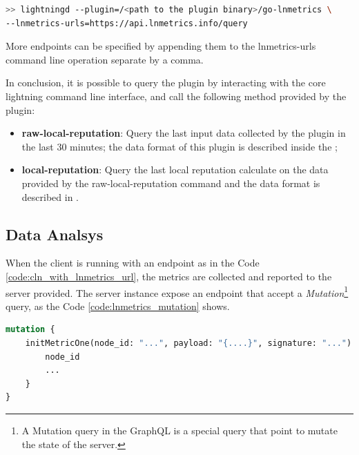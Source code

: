 \begin{lstlisting}[language=bash, basicstyle=\small,
                  caption={Command to run core lightning with the lnmetrics plugin an publish the data.}, 
                  label={code:cln_with_lnmetrics_url}]
>> lightningd --plugin=/<path to the plugin binary>/go-lnmetrics \ 
--lnmetrics-urls=https://api.lnmetrics.info/query
\end{lstlisting}

More endpoints can be specified by appending them to the lnmetrics-urls command line operation separate by a comma.

In conclusion, it is possible to query the plugin by interacting with the core lightning command line interface,
and call the following method provided by the plugin:

\begin{itemize}
    \item {\bf raw-local-reputation}: Query the last input data collected by the plugin in the last 30 minutes; 
        the data format of this plugin is described inside the \cite{lnmetrics_localreputation};
    \item {\bf local-reputation}: Query the last local reputation calculate on the data provided by the 
        raw-local-reputation command and the data format is described in \cite{lnmetrics_localreputation}.
\end{itemize}

\subsection{Data Analsys}

When the client is running with an endpoint as in the Code \ref{code:cln_with_lnmetrics_url},
the metrics are collected and reported to the server provided. The server instance expose an
endpoint that accept a \emph{Mutation}\footnote{A Mutation query in the GraphQL is a special query that point to mutate the state of the server.} query,
as the Code \ref{code:lnmetrics_mutation} shows.

\begin{lstlisting}[language=graphql, basicstyle=\small,
                  caption={Mutation query call by the client to initialize the metric on the server.}, 
                  label={code:lnmetrics_mutation}]
mutation {
    initMetricOne(node_id: "...", payload: "{....}", signature: "...") {
        node_id
        ...
    }
}
\end{lstlisting}

